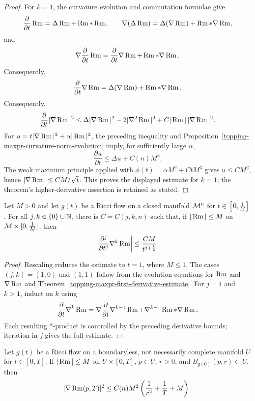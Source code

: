\begin{proof}
\sketch For $k=1$, the curvature evolution and commutation formulae give
\[
\frac{\partial}{\partial t}\operatorname{Rm}=\Delta\operatorname{Rm}+\operatorname{Rm}*\operatorname{Rm},
\qquad
\nabla(\Delta\operatorname{Rm})=\Delta(\nabla\operatorname{Rm})+\operatorname{Rm}*\nabla\operatorname{Rm},
\]
and
\[
\nabla\frac{\partial}{\partial t}\operatorname{Rm}
=\frac{\partial}{\partial t}\nabla\operatorname{Rm}+\operatorname{Rm}*\nabla\operatorname{Rm}.
\]
Consequently,
\[
\frac{\partial}{\partial t}\nabla\operatorname{Rm}
=\Delta(\nabla\operatorname{Rm})+\operatorname{Rm}*\nabla\operatorname{Rm}.
\]
Consequently,
\[
\frac{\partial}{\partial t}|\nabla\operatorname{Rm}|^2
\leq\Delta|\nabla\operatorname{Rm}|^2-2|\nabla^2\operatorname{Rm}|^2
 +C|\operatorname{Rm}|\,|\nabla\operatorname{Rm}|^2.
\]
For $u=t|\nabla\operatorname{Rm}|^2+\alpha|\operatorname{Rm}|^2$, the preceding inequality and
Proposition~\ref{topping-maxpr-curvature-norm-evolution} imply, for sufficiently large $\alpha$,
\[
\frac{\partial u}{\partial t}\leq\Delta u+C(n)M^3.
\]
The weak maximum principle applied with
$\phi(t)=\alpha M^2+CtM^3$ gives $u\leq CM^2$, hence
$|\nabla\operatorname{Rm}|\leq CM/\sqrt t$. This proves the displayed estimate for $k=1$;
the theorem's higher-derivative assertion is retained as stated.
\end{proof}

\begin{corollary}
\label{topping-maxpr-higher-derivatives}
Let $M>0$ and let $g(t)$ be a Ricci flow on a closed manifold $\mathcal{M}^n$ for
$t\in[0,\frac1M]$. For all $j,k\in\{0\}\cup\mathbb{N}$, there is
$C=C(j,k,n)$ such that, if $|\operatorname{Rm}|\leq M$ on
$\mathcal{M}\times[0,\frac1M]$, then
\[
\left|\frac{\partial^j}{\partial t^j}\nabla^k\operatorname{Rm}\right|
\leq\frac{CM}{t^{j+\frac{k}{2}}}.
\]
\end{corollary}

\begin{proof}
\sketch Rescaling reduces the estimate to $t=1$, where $M\leq1$. The cases
$(j,k)=(1,0)$ and $(1,1)$ follow from the evolution equations for $\operatorname{Rm}$ and
$\nabla\operatorname{Rm}$ and Theorem~\ref{topping-maxpr-first-derivative-estimate}. For $j=1$ and $k>1$, induct on $k$ using
\[
\frac{\partial}{\partial t}\nabla^k\operatorname{Rm}
=\nabla\frac{\partial}{\partial t}\nabla^{k-1}\operatorname{Rm}
 +\nabla^{k-1}\operatorname{Rm}*\nabla\operatorname{Rm}.
\]
Each resulting $*$-product is controlled by the preceding derivative bounds;
iteration in $j$ gives the full estimate.
\end{proof}

\begin{theorem}
\label{topping-maxpr-shi-estimate}
Let $g(t)$ be a Ricci flow on a boundaryless, not necessarily complete
manifold $U$ for $t\in[0,T]$. If $|\operatorname{Rm}|\leq M$ on $U\times[0,T]$, $p\in U$,
$r>0$, and $B_{g(0)}(p,r)\subset U$, then
\[
|\nabla\operatorname{Rm}(p,T)|^2\leq C(n)M^2
\left(\frac1{r^2}+\frac1T+M\right).
\]
\end{theorem}
